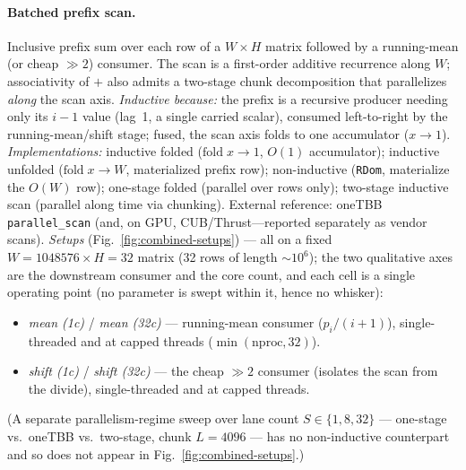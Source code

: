 \paragraph{Batched prefix scan.}
Inclusive prefix sum over each row of a $W\times H$ matrix followed by a
running-mean (or cheap $\gg 2$) consumer. The scan is a first-order additive
recurrence along $W$; associativity of $+$ also admits a two-stage chunk
decomposition that parallelizes \emph{along} the scan axis.
\emph{Inductive because:} the prefix is a recursive producer needing only its
$i{-}1$ value (lag~1, a single carried scalar), consumed left-to-right by the
running-mean/shift stage; fused, the scan axis folds to one accumulator
($x\!\to\!1$).
\emph{Implementations:} inductive folded ($\mathrm{fold}\;x\!\to\!1$, $O(1)$
accumulator); inductive unfolded ($\mathrm{fold}\;x\!\to\!W$, materialized prefix
row); non-inductive (\texttt{RDom}, materialize the $O(W)$ row); one-stage folded
(parallel over rows only); two-stage inductive scan (parallel along time via
chunking). External reference: oneTBB \texttt{parallel\_scan} (and, on GPU,
CUB/Thrust---reported separately as vendor scans).
\emph{Setups} (Fig.~\ref{fig:combined-setups}) --- all on a fixed
$W{=}1048576 \times H{=}32$ matrix (32 rows of length $\sim\!10^6$); the two
qualitative axes are the downstream consumer and the core count, and each cell is
a single operating point (no parameter is swept within it, hence no whisker):
\begin{itemize}\itemsep2pt
  \item \textit{mean (1c)} / \textit{mean (32c)} --- running-mean consumer
    ($p_i/(i{+}1)$), single-threaded and at capped threads ($\min(\mathrm{nproc},32)$).
  \item \textit{shift (1c)} / \textit{shift (32c)} --- the cheap $\gg2$ consumer
    (isolates the scan from the divide), single-threaded and at capped threads.
\end{itemize}
(A separate parallelism-regime sweep over lane count $S\in\{1,8,32\}$ ---
one-stage vs.\ oneTBB vs.\ two-stage, chunk $L{=}4096$ --- has no non-inductive
counterpart and so does not appear in Fig.~\ref{fig:combined-setups}.)

